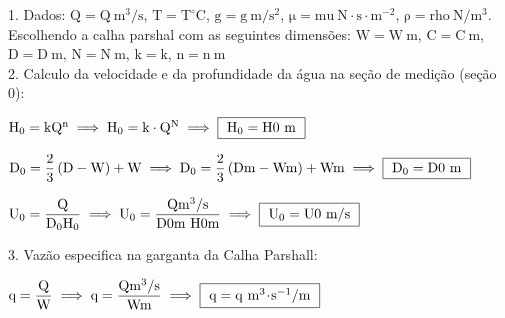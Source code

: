 \documentclass{article}
\newcommand{\myspace}{0.5cm}
\begin{document}

1. Dados: $\mathrm{Q = {{Q}} \ m^{3}/s}$, $\mathrm{T = {{T}} ^{\circ}C}$, $\mathrm{g = {{g}} \ m/s^{2}}$, $\mathrm{ \mu = {{mu}} \ N \! \cdot \! s \! \cdot \! m^{-2}}$, $\mathrm{ \rho = {{rho}} \ N/m^{3} }$. \\
Escolhendo a calha parshal com as seguintes dimensões: $\mathrm{W = {{W}} \ m}$, $\mathrm{C = {{C}} \ m}$,  $\mathrm{D = {{D}} \ m}$, $\mathrm{N = {{N}} \ m}$, $\mathrm{k = {{k}} }$, $\mathrm{n = {{n}} \ m}$ \\

2. Calculo da velocidade e da profundidade da água na seção de medição (seção 0):

\vspace{\myspace}

\begin{center}
	$
		\mathrm
		{
			H_{0} = kQ^{n}
		}
		\implies
		\mathrm
		{
			H_{0} = {{k}} \cdot {{Q}}^{ {{N}} }
		} 
		\implies 
		\fbox
		{ 
			$\mathrm
			{
				H_{0} = {{H0}} \ m
			}$
		} 
	$
\end{center}

\vspace{\myspace}

\begin{center}
	$
		\mathrm
		{
			D_{0} = \dfrac{2}{3} \left ( D - W \right ) + W
		} 
		\implies
		\mathrm
		{
			D_{0} = \dfrac{2}{3} \left ( {{D}} m - {{W}}m \right ) + {{W}} m
		}
		\implies 
		\fbox
		{ 
			$\mathrm
			{	
				D_{0} = {{D0}} \ m
			}$
		} 
	$	
\end{center}

\vspace{\myspace}

\begin{center}
	$
		\mathrm
		{
			U_{0} = \dfrac{Q}{D_{0}H_{0}}
		} 		
		\implies 
		\mathrm
		{
			U_{0} = \dfrac{ {{Q}}m^{3}/s }{ {{D0}}m \ {{H0}}m }
		}
		\implies 
		\fbox
		{ 
			$\mathrm
			{
				U_{0} = {{U0}} \ m/s
			}$
		}
	$  	
\end{center}

\vspace{\myspace}

3. Vazão especifica na garganta da Calha Parshall:

\vspace{\myspace}

\begin{center}
	$ 
		\mathrm
		{
			q = \dfrac{Q}{W}
		}
		\implies 
		\mathrm
		{
			q = \dfrac{ {{Q}} m^{3}/s }{ {{W}}m }			
		}
		\implies 
		\fbox
		{
		 	$\mathrm
		 	{	
		 		q = {{q}} \ m^{3} \! \cdot \! s^{-1}/m
		 	}$
		 }
	$
\end{center}
\end{document}
